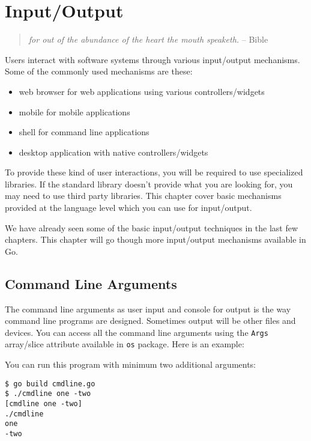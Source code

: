 \cleardoublepage
{}
\chapter{Input/Output}

\begin{quote}
\textit{for out of the abundance of the heart the mouth speaketh.} -- Bible
\end{quote}

Users interact with software systems through various input/output
 mechanisms.  Some of the commonly used mechanisms are these:

\begin{itemize}
  \item web browser for web applications using various controllers/widgets
  \item mobile for mobile applications
  \item shell for command line applications
  \item desktop application with native controllers/widgets
\end{itemize}

To provide these kind of user interactions, you will be required to use
specialized libraries. If the standard library doesn't provide what you are
looking for, you may need to use third party libraries. This chapter cover basic
mechanisms provided at the language level which you can use for input/output.

We have already seen some of the basic input/output techniques in the last few
chapters. This chapter will go though more input/output mechanisms available in
Go.

\section{Command Line Arguments}

The command line arguments as user input and
console for output is the way command line programs are designed.
Sometimes output will be other files and devices.  You can access all
the command line arguments using the \texttt{Args} array/slice
attribute available in \texttt{os} package.  Here is an example:



You can run this program with minimum two additional arguments:

\begin{lstlisting}[numbers=none]
$ go build cmdline.go
$ ./cmdline one -two
[cmdline one -two]
./cmdline
one
-two
\end{lstlisting}

